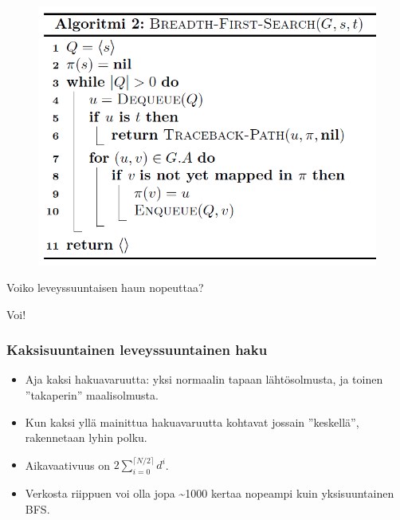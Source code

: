 \documentclass{beamer}
\begin{document}
\begin{frame}
\begin{figure}[H]
  \includegraphics[width=\textwidth,keepaspectratio]{bfs}
\end{figure}
\end{frame}

\begin{frame}
Voiko leveyssuuntaisen haun nopeuttaa?
\end{frame}

\begin{frame}
Voi!
\end{frame}

\begin{frame}
\frametitle{Kaksisuuntainen leveyssuuntainen haku}
\begin{itemize}
  \item Aja kaksi hakuavaruutta: yksi normaalin tapaan lähtösolmusta, ja toinen ''takaperin'' maalisolmusta.
  \item Kun kaksi yllä mainittua hakuavaruutta kohtavat jossain ''keskellä'', rakennetaan lyhin polku.
  \item Aikavaativuus on $2\sum_{i = 0}^{\lceil N / 2\rceil} d^i$.
  \item Verkosta riippuen voi olla jopa \textasciitilde 1000 kertaa nopeampi kuin yksisuuntainen BFS.
\end{itemize}
\end{frame}
\end{document}
